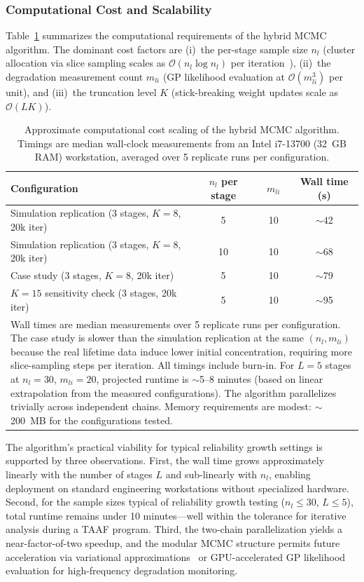 \documentclass[a4paper,fleqn,longmktitle]{cas-sc}
\begin{document}
\subsubsection{Computational Cost and Scalability}

Table~\ref{tab:computational_cost} summarizes the computational requirements of the hybrid MCMC algorithm. The dominant cost factors are (i)~the per-stage sample size $n_l$ (cluster allocation via slice sampling scales as $\mathcal{O}(n_l \log n_l)$ per iteration~\cite{Franzolini2025}), (ii)~the degradation measurement count $m_{li}$ (GP likelihood evaluation at $\mathcal{O}(m_{li}^3)$ per unit), and (iii)~the truncation level $K$ (stick-breaking weight updates scale as $\mathcal{O}(L K)$).

\begin{table}[h]
\centering
\caption{Approximate computational cost scaling of the hybrid MCMC algorithm. Timings are median wall-clock measurements from an Intel i7-13700 (32~GB RAM) workstation, averaged over 5 replicate runs per configuration.}
\label{tab:computational_cost}
\begin{tabular}{lccc}
\toprule
Configuration & $n_l$ per stage & $m_{li}$ & Wall time (s) \\
\midrule
Simulation replication (3 stages, $K=8$, 20k iter) & 5 & 10 & $\sim$42 \\
Simulation replication (3 stages, $K=8$, 20k iter) & 10 & 10 & $\sim$68 \\
Case study (3 stages, $K=8$, 20k iter) & 5 & 10 & $\sim$79 \\
$K=15$ sensitivity check (3 stages, 20k iter) & 5 & 10 & $\sim$95 \\
\midrule
\multicolumn{4}{p{\textwidth}}{\footnotesize Wall times are median measurements over 5 replicate runs per configuration. The case study is slower than the simulation replication at the same $(n_l, m_{li})$ because the real lifetime data induce lower initial concentration, requiring more slice-sampling steps per iteration. All timings include burn-in. For $L=5$ stages at $n_l=30$, $m_{li}=20$, projected runtime is $\sim$5--8 minutes (based on linear extrapolation from the measured configurations). The algorithm parallelizes trivially across independent chains. Memory requirements are modest: $\sim$200~MB for the configurations tested.}
\end{tabular}
\end{table}

The algorithm's practical viability for typical reliability growth settings is supported by three observations. First, the wall time grows approximately linearly with the number of stages $L$ and sub-linearly with $n_l$, enabling deployment on standard engineering workstations without specialized hardware. Second, for the sample sizes typical of reliability growth testing ($n_l \leq 30$, $L \leq 5$), total runtime remains under 10 minutes---well within the tolerance for iterative analysis during a TAAF program. Third, the two-chain parallelization yields a near-factor-of-two speedup, and the modular MCMC structure permits future acceleration via variational approximations~\cite{Blei2017} or GPU-accelerated GP likelihood evaluation for high-frequency degradation monitoring.
\end{document}
